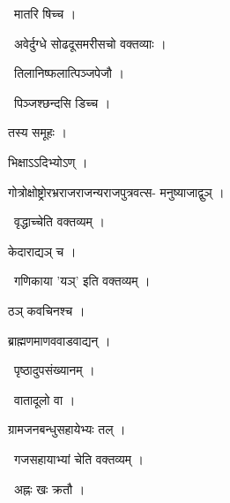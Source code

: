 \documentclass[10pt, openany, oneside]{book}
\begin{document}
\par\noindent\hspace{1.5em}{\vps वा॰}~{\qt मातरि षिच्च ।}

\par\noindent\hspace{1.5em}{\vps वा॰}~{\qt अवेर्दुग्धे सोढदूसमरीसचो वक्तव्याः ।}

\par\noindent\hspace{1.5em}{\vps वा॰}~{\qt तिलानिष्फलात्पिञ्जपेजौ ।}

\par\noindent\hspace{1.5em}{\vps वा॰}~{\qt पिञ्जश्छन्दसि डिच्च ।}

\noindent तस्य समूहः ।

\noindent भिक्षाऽऽदिभ्योऽण् ।

\noindent गोत्रोक्षोष्ट्रोरभ्रराजराजन्यराजपुत्रवत्स- मनुष्याजाद्वुञ् ।

\par\noindent\hspace{1.5em}{\vps वा॰}~{\qt वृद्धाच्चेति वक्तव्यम् ।}

\noindent केदाराद्यञ् च ।

\par\noindent\hspace{1.5em}{\vps वा॰}~{\qt गणिकाया 'यञ्' इति वक्तव्यम् ।}

\noindent ठञ् कवचिनश्च ।

\noindent ब्राह्मणमाणववाडवाद्यन् ।

\par\noindent\hspace{1.5em}{\vps वा॰}~{\qt पृष्ठादुपसंख्यानम् ।}

\par\noindent\hspace{1.5em}{\vps वा॰}~{\qt वातादूलो वा ।}

\noindent ग्रामजनबन्धुसहायेभ्यः तल् ।

\par\noindent\hspace{1.5em}{\vps वा॰}~{\qt गजसहायाभ्यां चेति वक्तव्यम् ।}

\par\noindent\hspace{1.5em}{\vps वा॰}~{\qt अह्नः खः क्रतौ ।}
\end{document}
